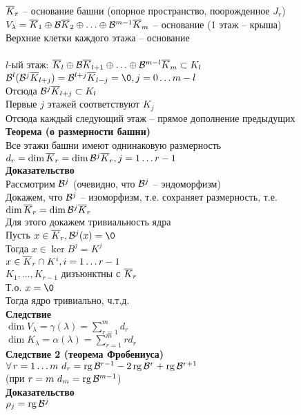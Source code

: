 \documentclass[12pt]{article}
\begin{document}
$\overline K_r$ -- основание башни (опорное пространство, поорожденное $J_r$)\\
$V_\lambda = \overline K_1 \oplus \mathcal{B} \overline K_2 \oplus \ldots \oplus \mathcal{B}^{m-1} \overline K_m$ -- основание (1 этаж -- крыша)\\
Верхние клетки каждого этажа -- основание\\\\
$l$-ый этаж: $\overline K_l \oplus \mathcal{B} \overline K_{l+1} \oplus \ldots \oplus \mathcal{B}^{m-l}\overline K_m \subset K_l$\\
$\mcB^l (\mcB^j \ol K_{l+j}) = \mcB^{l+j}\ol K_{l-j} = \0, j = 0\ldots m-l$\\
Отсюда $\mathcal{B}^j\overline K_{l+j} \subset K_l$\\
Первые $j$ этажей соответствуют $K_j$\\
Отсюда каждый следующий этаж -- прямое дополнение предыдущих\\
\textbf{Теорема (о размерности башни)}\\
Все этажи башни имеют однинаковую размерность $d_r = \dim \overline K_r = \dim \mathcal{B}^j \overline K_r, j = 1 \ldots r-1$\\
\textbf{Доказательство}\\
Рассмотрим $\mathcal{B}^j$ (очевидно, что $\mathcal{B}^j$ -- эндоморфизм)\\
Докажем, что $\mathcal{B}^j$ -- изоморфизм, т.е.  сохраняет размерность, т.е. $\dim \overline K_r = \dim \mathcal{B}^j \overline K_r$\\
Для этого докажем тривиальность ядра\\
Пусть $x \in \ol K_r, \mcB^j (x) = \0$\\
Тогда $x \in \ker B^j = K^j$\\
$x \in \overline K_r \cap K^i, i = 1\ldots r-1$\\
$K_1, \ldots, K_{r-1}$ дизъюнктны с $\overline K_r$\\
Т.о. $x = \0$\\
Тогда ядро тривиально, ч.т.д.\\
\textbf{Следствие}\\
$\dim V_\lambda = \gamma(\lambda) = \sum_{r=1}^m d_r$\\
$\dim K_\lambda = \alpha(\lambda) = \sum_{r=1}^m r d_r$\\
\textbf{Следствие 2 (теорема Фробениуса)}\\
$\forall\, r = 1\ldots m\ d_r = \operatorname{rg} \mathcal{B}^{r-1} - 2\operatorname{rg} \mathcal{B}^r + \operatorname{rg} \mathcal{B}^{r+1}$\\
(при $r = m\ d_m = \operatorname{rg} \mathcal{B}^{m-1}$)\\
\textbf{Доказательство}\\
$\rho_j = \operatorname{rg} \mathcal{B}^j$\\
\end{document}
